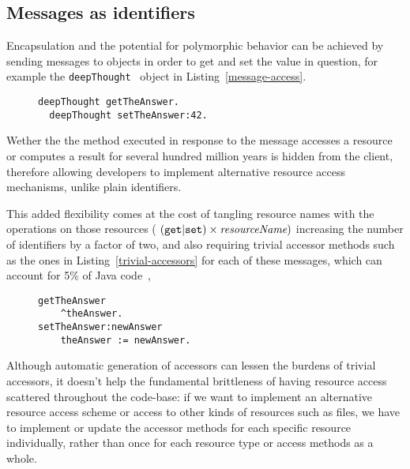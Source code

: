 \documentclass[preprint,authoryear]{llncs}
\begin{document}
\subsection{Messages as identifiers}

Encapsulation and the potential for polymorphic behavior can be achieved by sending 
messages to objects in order to get and set the value in question, for example the
{\tt deepThought}~\cite{adams1997hitchhiker}  object in Listing~\ref{message-access}.

\begin{figure}[htbp]
\begin{lstlisting}[style=L,label=message-access,caption=Retrieve and store value via message sends.]
  deepThought getTheAnswer.
  deepThought setTheAnswer:42.
\end{lstlisting}
\end{figure}

Wether the the method executed in response to the message accesses a resource or computes
a result for several hundred million years is hidden from the client, therefore allowing developers to
implement alternative resource access mechanisms, unlike plain identifiers.

This added flexibility comes at the cost of tangling resource names with the operations on those
resources (  $({\tt get}|{\tt set}) \times {\mbox{\em resourceName}} ) $ %
increasing the number of identifiers by a factor of two, and also requiring trivial accessor methods such as the
 ones in Listing~\ref{trivial-accessors} for each of these messages, which can account for 5\% of Java code~\cite{Spinellis:2002:MPC:510857.510868},


\begin{figure}[htbp]
\begin{lstlisting}[style=L,label=trivial-accessors,caption=Trivial accessors.]
getTheAnswer
    ^theAnswer.
setTheAnswer:newAnswer
    theAnswer := newAnswer.
\end{lstlisting}
\end{figure}

Although automatic generation of accessors can lessen the burdens of trivial accessors, it doesn't help the fundamental brittleness of 
having resource access scattered throughout the code-base: if we want to implement an alternative resource access scheme or 
access to other kinds of resources such as files, we  have to implement or update the accessor methods for each specific resource individually,
rather than once for each resource type or access methods as a whole.
\end{document}
